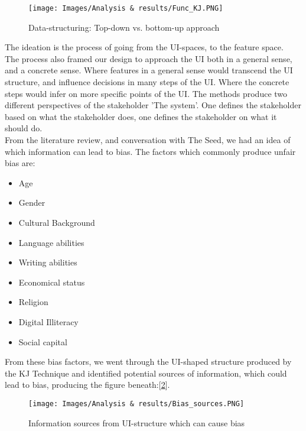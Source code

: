 \begin{figure}[H]
\caption{Data-structuring: Top-down vs. bottom-up approach}
\centering
\label{Func_KJ}
\texttt{[image: Images/Analysis \& results/Func\_KJ.PNG]}
\end{figure}

The ideation is the process of going from the UI-spaces, to the feature space.\\

The process also framed our design to approach the UI both in a general sense, and a concrete sense. Where features in a general sense would transcend the UI structure, and influence decisions in many steps of the UI. Where the concrete steps would infer on more specific points of the UI. The methods produce two different perspectives of the stakeholder 'The system'. One defines the stakeholder based on what the stakeholder does, one defines the stakeholder on what it should do.\\

From the literature review, and conversation with The Seed, we had an idea of which information can lead to bias. The factors which commonly produce unfair bias are:

\begin{itemize}
    \item Age
    \item Gender
    \item Cultural Background
    \item Language abilities
    \item Writing abilities
    \item Economical status
    \item Religion
    \item Digital Illiteracy
    \item Social capital
\end{itemize}

From these bias factors, we went through the UI-shaped structure produced by the KJ Technique and identified potential sources of information, which could lead to bias, producing the figure beneath:[\ref{Bias}].

\begin{figure}[H]
\caption{Information sources from UI-structure which can cause bias}
\centering
\label{Bias}
\texttt{[image: Images/Analysis \& results/Bias\_sources.PNG]}
\end{figure}

